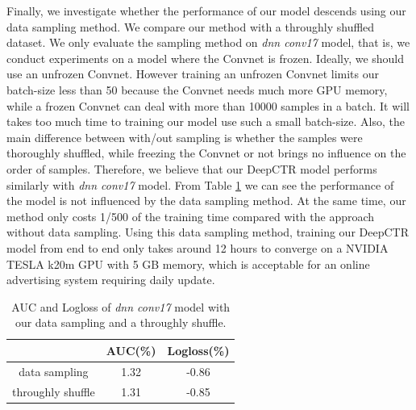 \documentclass{sig-alternate}
\begin{document}
Finally, we investigate whether the performance of our model descends using our data sampling method. We compare our method with a throughly shuffled dataset. We only evaluate the sampling method on  \emph{dnn conv17} model, that is, we conduct experiments on a model where the Convnet is frozen. Ideally, we should use an unfrozen Convnet. However training an unfrozen Convnet limits our batch-size less than 50  because the Convnet needs much more GPU memory, while a frozen Convnet can deal with more than 10000 samples in a batch. It will takes too much time to training our model use such a small batch-size. Also, the main difference between with/out sampling is whether the samples were thoroughly shuffled, while freezing the Convnet or not brings no influence on the order of samples. Therefore, we believe that our  DeepCTR model performs similarly with \emph{dnn conv17} model. From Table \ref{table:datasampling} we can see the performance of the model is not influenced by the data sampling method. At the same time, our method only costs 1/500 of the training time compared with the approach without data sampling. Using this data sampling method, training our DeepCTR model from end to end only takes around 12 hours to converge on a NVIDIA TESLA k20m GPU with 5 GB memory, which is acceptable for an online advertising system requiring daily update. 
\begin{table}
	\centering
	\caption{AUC and Logloss of \emph{dnn conv17} model with our data sampling and a throughly shuffle.}
	\label{table:datasampling}
	\begin{tabular}{|c|c|c|} \hline
		& AUC(\%) & Logloss(\%)\\ \hline
		data sampling & 1.32 & -0.86\\ \hline
		throughly shuffle & 1.31 & -0.85\\ \hline
	\end{tabular}
\end{table}
\end{document}
